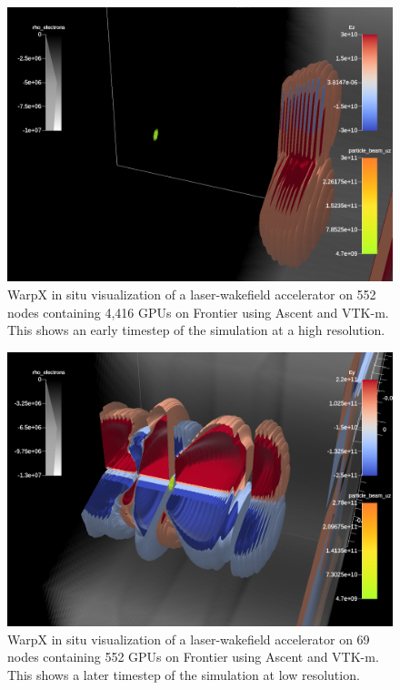 \begin{figure}
    \centering
    \includegraphics[width=\linewidth]{figures/ez_007050.png}
    \caption{WarpX in situ visualization of a laser-wakefield accelerator on 552 nodes containing 4,416 GPUs on Frontier using Ascent and VTK-m. This shows an early timestep of the simulation at a high resolution.}
    \label{fig:warpx_highres}
\end{figure}

\begin{figure}
    \centering
    \includegraphics[width=\linewidth]{figures/ey_009300.png}
    \caption{WarpX in situ visualization of a laser-wakefield accelerator on 69 nodes containing 552 GPUs on Frontier using Ascent and VTK-m. This shows a later timestep of the simulation at low resolution.}
    \label{fig:warpx_lowres}
\end{figure}

